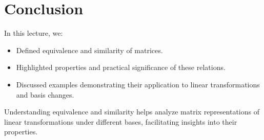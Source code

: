 \documentclass{article}
\begin{document}
\section*{Conclusion}

In this lecture, we:
\begin{itemize}
  \item Defined equivalence and similarity of matrices.
  \item Highlighted properties and practical significance of these relations.
  \item Discussed examples demonstrating their application to linear transformations and basis changes.
\end{itemize}

Understanding equivalence and similarity helps analyze matrix representations of linear transformations under different bases, facilitating insights into their properties.
\end{document}
